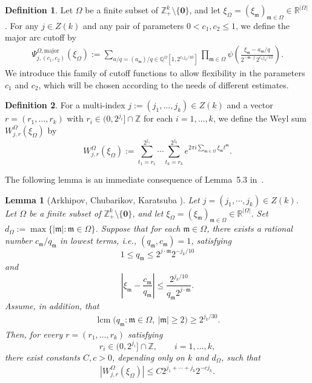 \documentclass[11 pt,letterpaper]{amsart}
\theoremstyle{plain}
\newtheorem{lemma}{Lemma}\numberwithin{lemma}{section}
\theoremstyle{definition}
\newtheorem{definition}{Definition}\numberwithin{definition}{section}
\theoremstyle{remark} \theoremstyle{exam} \theoremstyle{ob}
\numberwithin{equation}{section}
\begin{document}
\begin{definition}
	Let $\Omega$ be a finite subset of $\mathbb{Z}_+^k \setminus \{\mathbf{0}\}$, and let 
$\xi_{\Omega} = (\xi_{\mathfrak{m}})_{\mathfrak{m}\in\Omega} \in \mathbb{R}^{|\Omega|}$. 
For any $j \in Z(k)$ and any  pair of parameters $0 < c_1, c_2 \le 1$, we define the major arc cutoff by
\begin{align}\label{t12}
\Psi_{j,(c_1,c_2)}^{\Omega,\mathrm{major}}(\xi_{\Omega})
:= \sum_{a/q=(a_{\mathfrak{m}})/q \in \mathbb{Q}^{\Omega}[1,2^{c_1 j_k/10}]}
\prod_{\mathfrak{m}\in \Omega} 
\psi\!\left(
\frac{\xi_{\mathfrak{m}} - a_{\mathfrak{m}}/q}
{2^{-\mathfrak{m}\cdot j}\, 2^{c_2 j_k/10}}
\right).
\end{align}
We introduce this family of cutoff functions to allow flexibility in the parameters $c_1$ and $c_2$, which will be chosen according to the needs of different estimates.
\end{definition}
\begin{definition}\label{defi33}
For a multi-index $j := (j_1, \dots, j_k) \in Z(k)$ and a vector $r = (r_1, \dots, r_k)$ with $r_i \in (0, 2^{j_i}] \cap \mathbb{Z}$ for each $i = 1, \dots, k$, we define the Weyl sum $W_{j,r}^{\Omega}(\xi_\Omega)$ by
\[
W_{j,r}^{\Omega}(\xi_\Omega) := \sum_{t_1=r_1}^{2^{j_1}} \cdots \sum_{t_k=r_k}^{2^{j_k}} e^{2\pi i \sum_{\mathfrak{m} \in \Omega} \xi_{\mathfrak{m}} t^{\mathfrak{m}}}.
\]
\end{definition}


The following lemma is an immediate consequence of Lemma~5.3 in~\cite{ACK}.
\begin{lemma}[Arkhipov, Chubarikov, Karatsuba \cite{ACK}]\label{lem:ACK_bound}
Let $j=(j_1,\cdots,j_k) \in Z(k) $.	Let $\Omega$ be a finite subset of $\mathbb{Z}_+^k \setminus \{\mathbf{0}\}$, and let 
$\xi_{\Omega} = (\xi_{\mathfrak{m}})_{\mathfrak{m}\in\Omega} \in \mathbb{R}^{|\Omega|}$. Set $d_{\Omega}:=\max\{|\mathfrak{m}|:\mathfrak{m}\in \Omega\}$.  Suppose that for each $\mathfrak{m} \in \Omega$, there exists a   rational number $c_{\mathfrak{m}}/q_{\mathfrak{m}}$ in lowest terms, i.e., $(q_{\mathfrak{m}}, c_{\mathfrak{m}}) = 1$, satisfying 
\[
1 \le q_{\mathfrak{m}} \le 2^{j \cdot \mathfrak{m}} 2^{-j_k/10}
\]
and
\[
\left| \xi_{\mathfrak{m}} - \frac{c_{\mathfrak{m}}}{q_{\mathfrak{m}}} \right| \le \frac{2^{j_k/10}}{q_{\mathfrak{m}} 2^{j \cdot \mathfrak{m}}}.
\]
 Assume, in addition, that \begin{align} \label{dmm1} \operatorname{lcm} \bigl(q_{\mathfrak m}:\mathfrak m\in\Omega,\ |\mathfrak m|\geq 2\bigr) \geq 2^{j_k/30}. \end{align} Then, for every $r=(r_1,\ldots,r_k)$ satisfying \[ r_i\in(0,2^{j_i}]\cap\mathbb{Z}, \qquad i=1,\ldots,k, \] there exist constants $C,c>0$, depending only on $k$ and $d_{\Omega}$, such that \begin{align} \label{wop} \left| W_{j,r}^{\Omega}(\xi_{\Omega}) \right| \leq C2^{j_1+\cdots+j_k}2^{-cj_k}. \end{align} \end{lemma}
\end{document}
